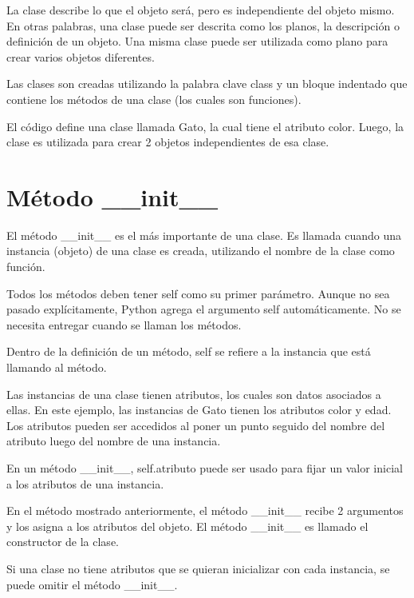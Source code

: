 \documentclass{report}
\begin{document}
La clase describe lo que el objeto será, pero es independiente del objeto mismo. En otras palabras, una clase puede ser descrita como los planos, la descripción o definición de un objeto. Una misma clase puede ser utilizada como plano para crear varios objetos diferentes.\smallskip

Las clases son creadas utilizando la palabra clave class y un bloque indentado que contiene los métodos de una clase (los cuales son funciones).


El código define una clase llamada Gato, la cual tiene el atributo color. Luego, la clase es utilizada para crear 2 objetos independientes de esa clase.

\section{Método \_\_init\_\_}

El método \_\_init\_\_ es el más importante de una clase. Es llamada cuando una instancia (objeto) de una clase es creada, utilizando el nombre de la clase como función.\smallskip

Todos los métodos deben tener self como su primer parámetro. Aunque no sea pasado explícitamente, Python agrega el argumento self automáticamente. No se necesita entregar cuando se llaman los métodos.\smallskip

Dentro de la definición de un método, self se refiere a la instancia que está llamando al método.\smallskip

Las instancias de una clase tienen atributos, los cuales son datos asociados a ellas. En este ejemplo, las instancias de Gato tienen los atributos color y edad. Los atributos pueden ser accedidos al poner un punto seguido del nombre del atributo luego del nombre de una instancia.


En un método \_\_init\_\_, self.atributo puede ser usado para fijar un valor inicial a los atributos de una instancia.\smallskip

En el método mostrado anteriormente, el método \_\_init\_\_ recibe 2 argumentos y los asigna a los atributos del objeto. El método \_\_init\_\_ es llamado el constructor de la clase.\smallskip

Si una clase no tiene atributos que se quieran inicializar con cada instancia, se puede omitir el método \_\_init\_\_.
\end{document}
